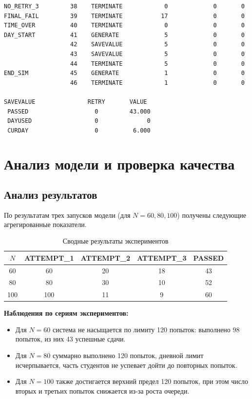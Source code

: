 \documentclass[a4paper, 14pt]{extarticle}
\begin{document}
\begin{longlisting}
\begin{verbatim}
NO_RETRY_3         38    TERMINATE            0             0       0
FINAL_FAIL         39    TERMINATE           17             0       0
TIME_OVER          40    TERMINATE            0             0       0
DAY_START          41    GENERATE             5             0       0
                   42    SAVEVALUE            5             0       0
                   43    SAVEVALUE            5             0       0
                   44    TERMINATE            5             0       0
END_SIM            45    GENERATE             1             0       0
                   46    TERMINATE            1             0       0

SAVEVALUE               RETRY       VALUE
 PASSED                   0         43.000                            
 DAYUSED                  0              0                            
 CURDAY                   0          6.000                            
\end{verbatim}
\end{longlisting}

\section{Анализ модели и проверка качества}
\subsection{Анализ результатов}
По результатам трех запусков модели (для $N=60, 80, 100$) получены следующие агрегированные показатели.

\begin{table}[H]
\centering
\begin{tabular}{|c|c|c|c|c|}
\hline
\textbf{$N$} & \textbf{ATTEMPT\_1} & \textbf{ATTEMPT\_2} & \textbf{ATTEMPT\_3} & \textbf{PASSED} \\
\hline
60 & 60 & 20 & 18 & 43 \\
\hline
80 & 80 & 30 & 10 & 52 \\
\hline
100 & 100 & 11 & 9 & 60 \\
\hline
\end{tabular}
\caption{Сводные результаты экспериментов}
\label{tab:results}
\end{table}

\textbf{Наблюдения по сериям экспериментов:}
\begin{itemize}
  \item Для $N=60$ система не насыщается по лимиту 120 попыток: выполнено 98 попыток, из них 43 успешные сдачи.
  \item Для $N=80$ суммарно выполнено 120 попыток, дневной лимит исчерпывается, часть студентов не успевает дойти до повторных попыток.
  \item Для $N=100$ также достигается верхний предел 120 попыток, при этом число вторых и третьих попыток снижается из-за роста очереди.
\end{itemize}
\end{document}
